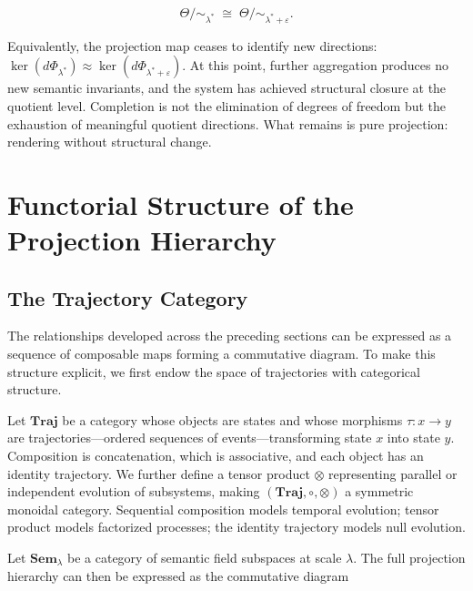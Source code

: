 \documentclass[11pt, twoside]{article}
\theoremstyle{plain}
\theoremstyle{definition}
\theoremstyle{remark}
\begin{document}
\[
\Theta / {\sim_{\lambda^*}} \;\cong\; \Theta / {\sim_{\lambda^* + \varepsilon}}.
\]

Equivalently, the projection map ceases to identify new directions: $\ker(d\Phi_{\lambda^*}) \approx \ker(d\Phi_{\lambda^* + \varepsilon})$. At this point, further aggregation produces no new semantic invariants, and the system has achieved structural closure at the quotient level. Completion is not the elimination of degrees of freedom but the exhaustion of meaningful quotient directions. What remains is pure projection: rendering without structural change.

\section{Functorial Structure of the Projection Hierarchy}
\label{sec:functorial}

\subsection{The Trajectory Category}

The relationships developed across the preceding sections can be expressed as a sequence of composable maps forming a commutative diagram. To make this structure explicit, we first endow the space of trajectories with categorical structure.

Let $\mathbf{Traj}$ be a category whose objects are states and whose morphisms $\tau : x \to y$ are trajectories---ordered sequences of events---transforming state $x$ into state $y$. Composition is concatenation, which is associative, and each object has an identity trajectory. We further define a tensor product $\otimes$ representing parallel or independent evolution of subsystems, making $(\mathbf{Traj}, \circ, \otimes)$ a symmetric monoidal category. Sequential composition models temporal evolution; tensor product models factorized processes; the identity trajectory models null evolution.

Let $\mathbf{Sem}_\lambda$ be a category of semantic field subspaces at scale $\lambda$. The full projection hierarchy can then be expressed as the commutative diagram

\begin{center}
\end{center}
\end{document}
